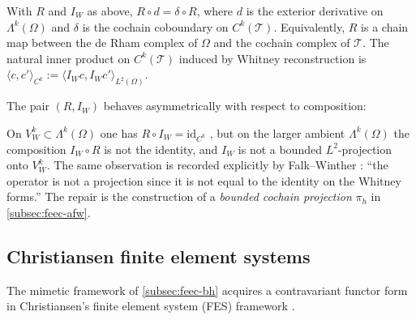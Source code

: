 \begin{proposition}
\label{prop:commuting-stokes}
With $R$ and $I_W$ as above, $R \circ d = \delta \circ R$, where $d$
is the exterior derivative on $\Lambda^k(\Omega)$ and $\delta$ is the
cochain coboundary on $C^k(\mathcal{T})$. Equivalently, $R$ is a
chain map between the de Rham complex of $\Omega$ and the cochain
complex of $\mathcal{T}$. The natural inner product on
$C^k(\mathcal{T})$ induced by Whitney reconstruction is
$\langle c, c' \rangle_{C^k} := \langle I_W c, I_W c' \rangle_{L^2(\Omega)}$.
\end{proposition}

The pair $(R, I_W)$ behaves asymmetrically with respect to composition:

\begin{remark}\label{rem:IW-not-projection}
On $V_W^k \subset \Lambda^k(\Omega)$ one has $R \circ I_W = \mathrm{id}_{C^k}$
\cite{Whitney1957}, but on the larger ambient $\Lambda^k(\Omega)$ the
composition $I_W \circ R$ is not the identity, and $I_W$ is not a
bounded $L^2$-projection onto $V_W^k$. The same observation is
recorded explicitly by Falk--Winther \cite{FalkWinther2014}: ``the
operator is not a projection since it is not equal to the identity on
the Whitney forms.'' The repair is the construction of a
\emph{bounded cochain projection} $\pi_h$ in
\cref{subsec:feec-afw}.
\end{remark}

\subsection{Christiansen finite element systems}\label{subsec:feec-fes}

The mimetic framework of \cref{subsec:feec-bh} acquires a contravariant
functor form in Christiansen's finite element system (FES) framework
\cite{Christiansen2010}.

